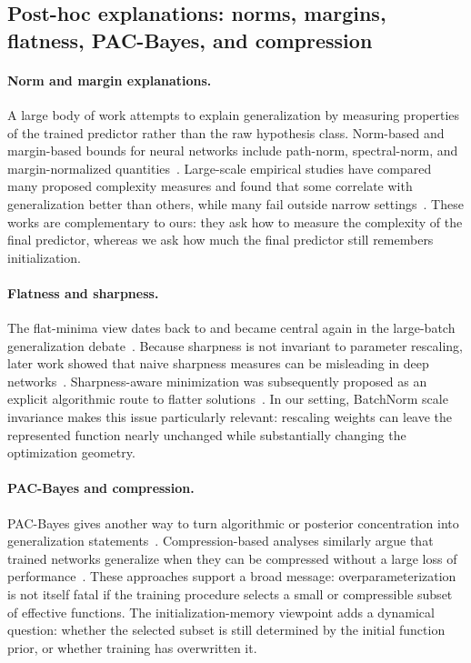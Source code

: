 \documentclass{article}
\begin{document}
\subsection{Post-hoc explanations: norms, margins, flatness, PAC-Bayes, and compression}
\label{app:posthoc-generalization}

\paragraph{Norm and margin explanations.}
A large body of work attempts to explain generalization by measuring properties of the trained predictor rather than the raw hypothesis class.  Norm-based and margin-based bounds for neural networks include path-norm, spectral-norm, and margin-normalized quantities~\citep{neyshabur2015norm,neyshabur2017exploring,bartlett2017spectrally,neyshabur2018pacbayes,jiang2019predicting}.  Large-scale empirical studies have compared many proposed complexity measures and found that some correlate with generalization better than others, while many fail outside narrow settings~\citep{jiang2020fantastic}.  These works are complementary to ours: they ask how to measure the complexity of the final predictor, whereas we ask how much the final predictor still remembers initialization.

\paragraph{Flatness and sharpness.}
The flat-minima view dates back to \citep{hochreiter1997flat} and became central again in the large-batch generalization debate~\citep{keskar2017large}.  Because sharpness is not invariant to parameter rescaling, later work showed that naive sharpness measures can be misleading in deep networks~\citep{dinh2017sharp}.  Sharpness-aware minimization was subsequently proposed as an explicit algorithmic route to flatter solutions~\citep{foret2021sam}.  In our setting, BatchNorm scale invariance makes this issue particularly relevant: rescaling weights can leave the represented function nearly unchanged while substantially changing the optimization geometry.

\paragraph{PAC-Bayes and compression.}
PAC-Bayes gives another way to turn algorithmic or posterior concentration into generalization statements~\citep{mcallester1999pac,dziugaite2017computing,neyshabur2018pacbayes,zhou2019nonvacuous}.  Compression-based analyses similarly argue that trained networks generalize when they can be compressed without a large loss of performance~\citep{arora2018stronger}.  These approaches support a broad message: overparameterization is not itself fatal if the training procedure selects a small or compressible subset of effective functions.  The initialization-memory viewpoint adds a dynamical question: whether the selected subset is still determined by the initial function prior, or whether training has overwritten it.
\end{document}
